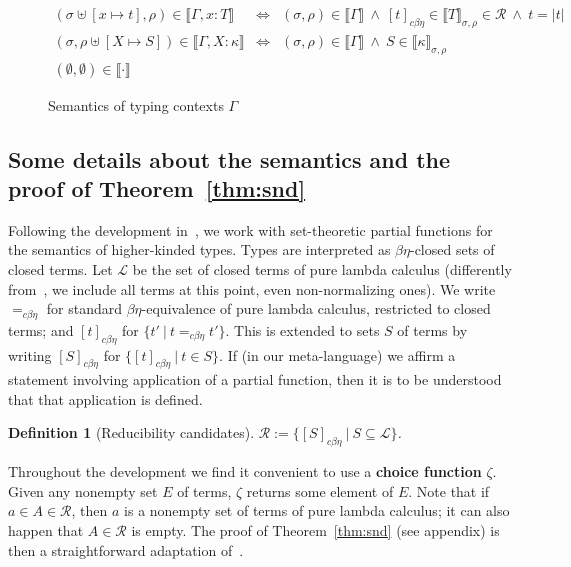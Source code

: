 \documentclass{article}
\newcommand{\choice}[0]{\zeta}
\newcommand{\interp}[1]{\llbracket #1 \rrbracket}
\newcommand{\cbe}[0]{c\beta\eta}
\newtheorem{definition}[theorem]{Definition}
\begin{document}
\begin{figure}
\[
\begin{array}{lll}
(\sigma\uplus[x\mapsto t],\rho)\in\interp{\Gamma,x:T} & \Leftrightarrow & (\sigma,\rho)\in\interp{\Gamma} \ \wedge\ 
 [t]_{\cbe}\in\interp{T}_{\sigma,\rho}\in\mathcal{R}\ \wedge\ t = |t| \\
(\sigma,\rho\uplus[X\mapsto S])\in\interp{\Gamma,X:\kappa} & \Leftrightarrow & (\sigma,\rho)\in\interp{\Gamma} \ \wedge\ 
S\in\interp{\kappa}_{\sigma,\rho} \\
(\emptyset,\emptyset)\in\interp{\cdot}
\end{array}
\]
\caption{Semantics of typing contexts $\Gamma$}
\label{fig:semctxt}
\end{figure}

\subsection{Some details about the semantics and the proof of Theorem~\ref{thm:snd}}
\label{sec:snd}

Following the development in~\cite{stump17}, we work with
set-theoretic partial functions for the semantics of higher-kinded
types.  Types are interpreted as $\beta\eta$-closed sets of closed
terms. Let $\mathcal{L}$ be the set of closed terms of pure lambda calculus
(differently from~\cite{stump17}, we include all terms at this point,
even non-normalizing ones).  We
write $=_{\cbe}$ for standard $\beta\eta$-equivalence of pure lambda calculus, restricted to
closed terms; and $[t]_{\cbe}$ for $\{ t'\ |\ t =_{\cbe} t'\}$.  This
is extended to sets $S$ of terms by writing $[S]_{\cbe}$ for
$\{[t]_{\cbe}\ |\ t\in S\}$.  %
If (in our meta-language) we affirm a statement
involving application of a partial function, then it is to be
understood that that application is defined.

\begin{definition}[Reducibility candidates]
  $\mathcal{R} := \{ [S]_{\cbe}\ |\ S\subseteq \mathcal{L} \}$.
\end{definition}

Throughout the development we find it convenient to use a
\textbf{choice function} $\choice$.  Given any nonempty set $E$ of
terms, $\choice$ returns some element of $E$.  Note that if $a \in A
\in \mathcal{R}$, then $a$ is a nonempty set of terms of pure lambda
calculus; it can also happen that $A \in\mathcal{R}$ is empty.  The
proof of Theorem~\ref{thm:snd} (see appendix) is then a straightforward adaptation of~\cite{stump17}. 
\end{document}
